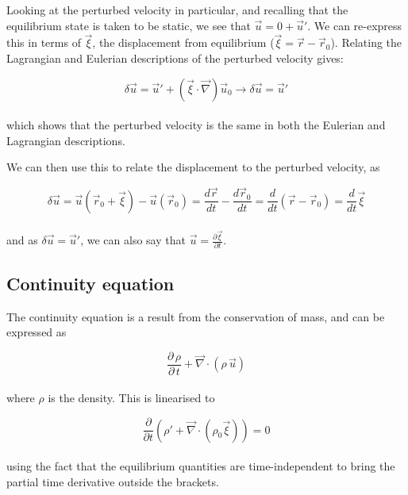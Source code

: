 \documentclass[11pt]{amsart}
\begin{document}
Looking at the perturbed velocity in particular, and recalling that the equilibrium state is taken
to be static, we see that $\vec{u} = 0 + \vec{u}'$.  We can re-express this in terms of $\vec{\xi}$,
 the displacement from equilibrium ($\vec{\xi} = \vec{r} - \vec{r}_{0}$).  Relating the Lagrangian and 
Eulerian descriptions of the perturbed velocity gives:

\begin{equation}
\delta \vec{u} = \vec{u}' + (\vec{\xi} \cdot \vec{\nabla}) \vec{u}_{0} \longrightarrow \delta \vec{u} = \vec{u}'
\end{equation}
\\
which shows that the perturbed velocity is the same in both the Eulerian and Lagrangian descriptions.

We can then use this to relate the displacement to the perturbed velocity, as

\begin{equation}
\delta \vec{u} = \vec{u}(\vec{r}_{0} + \vec{\xi}) - \vec{u}(\vec{r}_{0}) = \frac{d\vec{r}}{dt} - \frac{d\vec{r}_{0}}{dt}
= \frac{d}{dt} \left( \vec{r} - \vec{r}_{0} \right) = \frac{d}{dt} \vec{\xi}
\end{equation}
\\
and as $\delta\vec{u} = \vec{u}'$, we can also say that $\vec{u} = \frac{\partial \vec{\xi}}{\partial t}$.






\subsection{Continuity equation}

The continuity equation is a result from the conservation of mass, and can be expressed as

\begin{equation} \frac{\partial \, \rho}{\partial \, t} + \vec{\nabla} \cdot ( \rho \, \vec{u} )
\end{equation}
\\
where $\rho$ is the density.  This is linearised to

\begin{equation}
\frac{\partial}{\partial t} \left( \rho' + \vec{\nabla} \cdot \left( \rho_{0} \vec{\xi} \right) \right) = 0
\end{equation}
\\
using the fact that the equilibrium quantities are time-independent to bring the partial time
derivative outside the brackets.
\end{document}
